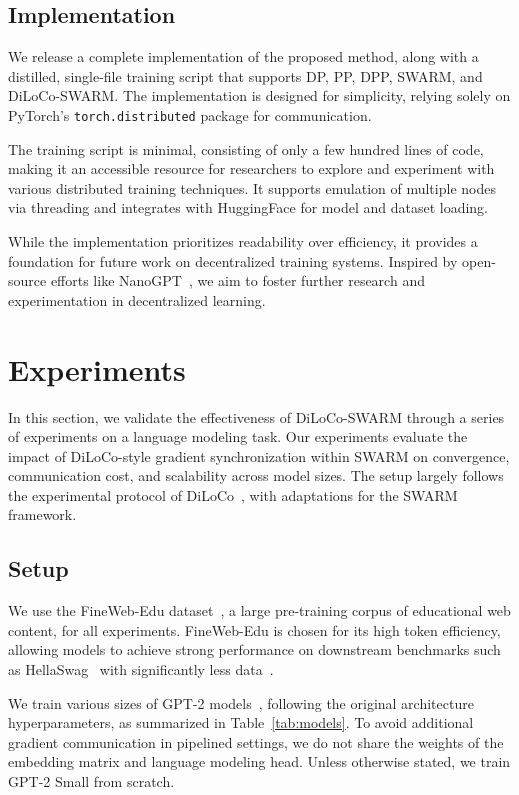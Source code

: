 \documentclass{article}
\begin{document}
\subsection{Implementation}

We release a complete implementation of the proposed method, along with a distilled, single-file training script that supports DP, PP, DPP, SWARM, and DiLoCo-SWARM. The implementation is designed for simplicity, relying solely on PyTorch's \texttt{torch.distributed} package for communication. 

The training script is minimal, consisting of only a few hundred lines of code, making it an accessible resource for researchers to explore and experiment with various distributed training techniques. It supports emulation of multiple nodes via threading and integrates with HuggingFace for model and dataset loading. 

While the implementation prioritizes readability over efficiency, it provides a foundation for future work on decentralized training systems. Inspired by open-source efforts like NanoGPT~\cite{karpathy2024nanogpt}, we aim to foster further research and experimentation in decentralized learning.

\section{Experiments}

In this section, we validate the effectiveness of DiLoCo-SWARM through a series of experiments on a language modeling task. Our experiments evaluate the impact of DiLoCo-style gradient synchronization within SWARM on convergence, communication cost, and scalability across model sizes. The setup largely follows the experimental protocol of DiLoCo~\cite{douillard2023diloco}, with adaptations for the SWARM framework.

\subsection{Setup}

We use the FineWeb-Edu dataset~\cite{penedo2024fineweb}, a large pre-training corpus of educational web content, for all experiments. FineWeb-Edu is chosen for its high token efficiency, allowing models to achieve strong performance on downstream benchmarks such as HellaSwag~\cite{zellers2019hellaswag} with significantly less data~\cite{karpathy2024nanogpt}.

We train various sizes of GPT-2 models~\cite{radford2019gpt2}, following the original architecture hyperparameters, as summarized in Table~\ref{tab:models}. To avoid additional gradient communication in pipelined settings, we do not share the weights of the embedding matrix and language modeling head. Unless otherwise stated, we train GPT-2 Small from scratch.
\end{document}
